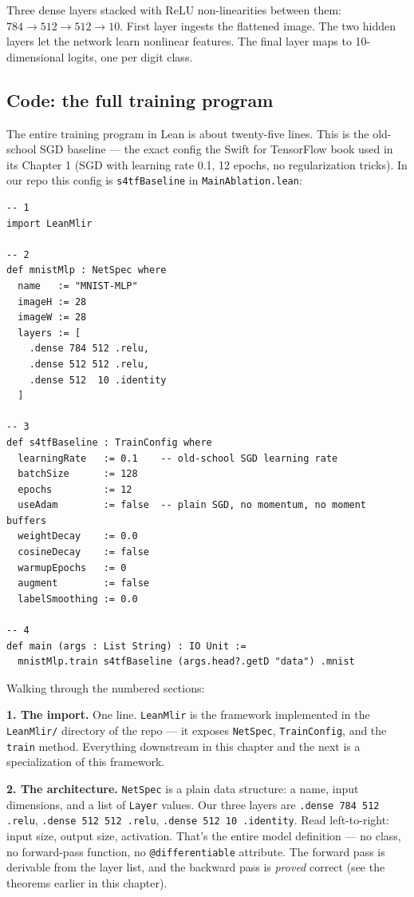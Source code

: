 Three dense layers stacked with ReLU non-linearities between them:
$784 \to 512 \to 512 \to 10$. First layer ingests the flattened
image. The two hidden layers let the network learn nonlinear
features. The final layer maps to 10-dimensional logits, one per
digit class.

\subsection*{Code: the full training program}

The entire training program in Lean is about twenty-five lines. This
is the old-school SGD baseline --- the exact config the Swift for
TensorFlow book used in its Chapter 1 (SGD with learning rate 0.1,
12 epochs, no regularization tricks). In our repo this config is
\texttt{s4tfBaseline} in \texttt{MainAblation.lean}:

\begin{verbatim}
-- 1
import LeanMlir

-- 2
def mnistMlp : NetSpec where
  name   := "MNIST-MLP"
  imageH := 28
  imageW := 28
  layers := [
    .dense 784 512 .relu,
    .dense 512 512 .relu,
    .dense 512  10 .identity
  ]

-- 3
def s4tfBaseline : TrainConfig where
  learningRate   := 0.1    -- old-school SGD learning rate
  batchSize      := 128
  epochs         := 12
  useAdam        := false  -- plain SGD, no momentum, no moment buffers
  weightDecay    := 0.0
  cosineDecay    := false
  warmupEpochs   := 0
  augment        := false
  labelSmoothing := 0.0

-- 4
def main (args : List String) : IO Unit :=
  mnistMlp.train s4tfBaseline (args.head?.getD "data") .mnist
\end{verbatim}

Walking through the numbered sections:

\textbf{1. The import.} One line. \texttt{LeanMlir} is the framework
implemented in the \texttt{LeanMlir/} directory of the repo --- it
exposes \texttt{NetSpec}, \texttt{TrainConfig}, and the
\texttt{train} method. Everything downstream in this chapter and
the next is a specialization of this framework.

\textbf{2. The architecture.} \texttt{NetSpec} is a plain data
structure: a name, input dimensions, and a list of \texttt{Layer}
values. Our three layers are \texttt{.dense 784 512 .relu},
\texttt{.dense 512 512 .relu}, \texttt{.dense 512 10 .identity}.
Read left-to-right: input size, output size, activation. That's the
entire model definition --- no class, no forward-pass function, no
\texttt{@differentiable} attribute. The forward pass is derivable
from the layer list, and the backward pass is \emph{proved} correct
(see the theorems earlier in this chapter).

